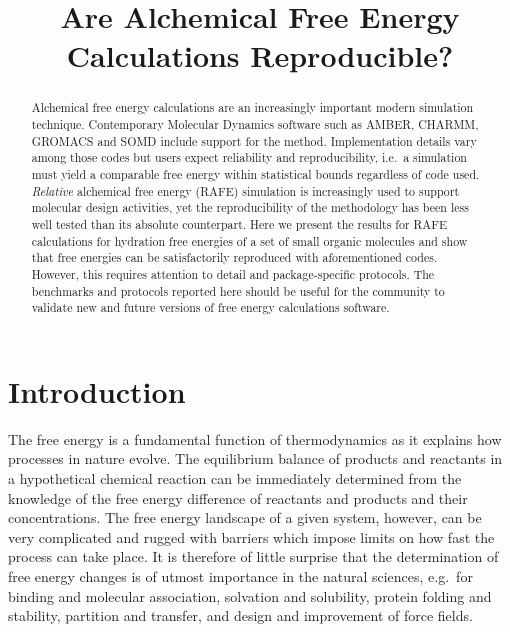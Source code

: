 \documentclass[journal=jctcce,manuscript=article]{achemso}
\title{Are Alchemical Free Energy Calculations Reproducible?}
\begin{document}
\begin{abstract}
  Alchemical free energy calculations are an increasingly important modern 
  simulation technique.  Contemporary Molecular Dynamics software such as AMBER, CHARMM, GROMACS and SOMD include support for the method. Implementation details vary among those codes but users expect reliability and reproducibility, i.e.\ a simulation must yield a comparable free energy within statistical bounds regardless of code used.  \emph{Relative} alchemical free energy (RAFE) simulation is increasingly used to support molecular design activities, yet the reproducibility of the methodology has been less well tested than its absolute counterpart.  Here we present the results for RAFE calculations for hydration free energies of a set of small 
  organic molecules and show that free energies can be satisfactorily 
  reproduced with aforementioned codes. However, this requires attention to 
  detail and package-specific protocols. The benchmarks and protocols reported 
  here should be useful for the community to validate new and future versions of free energy calculations software.
\end{abstract}

\begin{tocentry}
\end{tocentry}


\section{Introduction}
\label{sec:intro}

The free energy is a fundamental function of thermodynamics as it explains 
how processes in nature evolve.  The equilibrium balance of products and reactants in a hypothetical chemical reaction can be immediately determined
from the knowledge of the free energy difference of reactants and
products and their concentrations.  The free energy landscape of a given 
system, however, can be very complicated and rugged with barriers which impose
limits on how fast the process can take place.  It is therefore of
little surprise that the determination of free energy changes is of
utmost importance in the natural sciences, e.g.\ for binding and
molecular association, solvation and solubility, protein folding and
stability, partition and transfer, and design and improvement of force
fields. 
\end{document}
